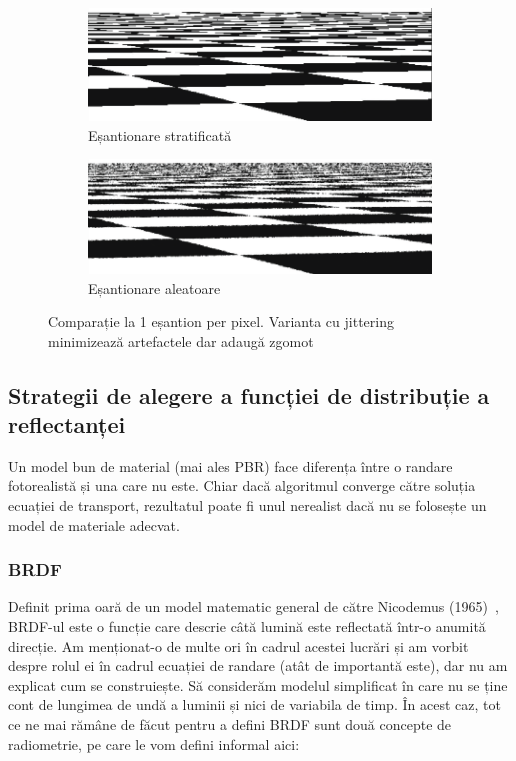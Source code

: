 \documentclass[12pt,a4paper]{report}
\numberwithin{equation}{section} %
\begin{document}
\begin{figure}[ht]
	\centering
	\begin{subfigure}[h]{0.7\linewidth}
		\centering
		\includegraphics[width=\linewidth]{pics/uniform-checkerboard.png}
		\caption{Eșantionare stratificată}
	\end{subfigure}
	\hfill
	\begin{subfigure}[h]{0.7\linewidth}
		\centering
		\includegraphics[width=\linewidth]{pics/jittered-checkerboard.png}
		\caption{Eșantionare aleatoare}
	\end{subfigure}
	\caption{Comparație la 1 eșantion per pixel. Varianta cu jittering minimizează artefactele dar adaugă zgomot\protect{}}
	\label{fig:sampling_aliasing}
\end{figure}

\subsection{\label{sec:pbr}Strategii de alegere a funcției de distribuție a reflectanței}

Un model bun de material (mai ales PBR) face diferența între o randare fotorealistă
și una care nu este. Chiar dacă algoritmul converge către soluția ecuației de transport,
rezultatul poate fi unul nerealist dacă nu se folosește un model de materiale adecvat.

\subsubsection*{BRDF}

Definit prima oară de un model matematic general de către Nicodemus (1965)~\cite{Nicodemus},
BRDF-ul este o funcție care descrie câtă lumină este reflectată într-o anumită direcție.
Am menționat-o de multe ori în cadrul acestei lucrări și am vorbit despre rolul
ei în cadrul ecuației de randare (atât de importantă este),
dar nu am explicat cum se construiește. Să considerăm modelul simplificat
în care nu se ține cont de lungimea de undă a luminii și nici de variabila de timp.
În acest caz, tot ce ne mai rămâne de făcut pentru a defini BRDF sunt două concepte
de radiometrie, pe care le vom defini informal aici:
\end{document}
